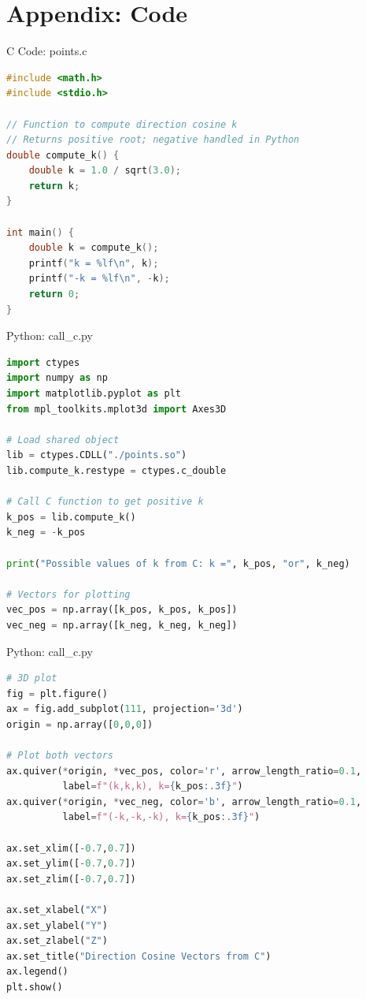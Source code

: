 \documentclass{beamer}
\numberwithin{equation}{section}
\begin{document}
\section*{Appendix: Code}

\begin{frame}[fragile]{C Code: points.c}
\begin{lstlisting}[language=C]
#include <math.h>
#include <stdio.h>

// Function to compute direction cosine k
// Returns positive root; negative handled in Python
double compute_k() {
    double k = 1.0 / sqrt(3.0);
    return k;
}

int main() {
    double k = compute_k();
    printf("k = %lf\n", k);
    printf("-k = %lf\n", -k);
    return 0;
}
\end{lstlisting}
\end{frame}

\begin{frame}[fragile]{Python: call\_c.py}
\begin{lstlisting}[language=Python]
import ctypes
import numpy as np
import matplotlib.pyplot as plt
from mpl_toolkits.mplot3d import Axes3D

# Load shared object
lib = ctypes.CDLL("./points.so")
lib.compute_k.restype = ctypes.c_double

# Call C function to get positive k
k_pos = lib.compute_k()
k_neg = -k_pos

print("Possible values of k from C: k =", k_pos, "or", k_neg)

# Vectors for plotting
vec_pos = np.array([k_pos, k_pos, k_pos])
vec_neg = np.array([k_neg, k_neg, k_neg])
\end{lstlisting}
\end{frame}
\begin{frame}[fragile]{Python: call\_c.py}
\begin{lstlisting}[language=Python]
# 3D plot
fig = plt.figure()
ax = fig.add_subplot(111, projection='3d')
origin = np.array([0,0,0])

# Plot both vectors
ax.quiver(*origin, *vec_pos, color='r', arrow_length_ratio=0.1,
          label=f"(k,k,k), k={k_pos:.3f}")
ax.quiver(*origin, *vec_neg, color='b', arrow_length_ratio=0.1,
          label=f"(-k,-k,-k), k={k_pos:.3f}")

ax.set_xlim([-0.7,0.7])
ax.set_ylim([-0.7,0.7])
ax.set_zlim([-0.7,0.7])

ax.set_xlabel("X")
ax.set_ylabel("Y")
ax.set_zlabel("Z")
ax.set_title("Direction Cosine Vectors from C")
ax.legend()
plt.show()
\end{lstlisting}
\end{frame}
\end{document}
